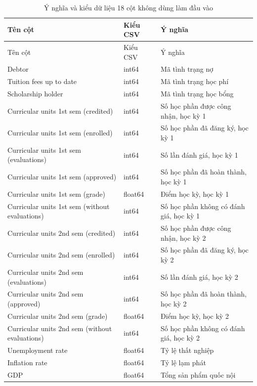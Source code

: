 \begin{longtable}{>{\raggedright\arraybackslash}p{6.3cm}p{1.5cm}>{\raggedright\arraybackslash}p{5.2cm}}
\caption{Ý nghĩa và kiểu dữ liệu 18 cột không dùng làm đầu vào}\\\toprule
Tên cột & Kiểu CSV & Ý nghĩa\\\midrule\endfirsthead
\toprule Tên cột & Kiểu CSV & Ý nghĩa\\\midrule\endhead
Debtor & int64 & Mã tình trạng nợ\\
Tuition fees up to date & int64 & Mã tình trạng học phí\\
Scholarship holder & int64 & Mã tình trạng học bổng\\
Curricular units 1st sem (credited) & int64 & Số học phần được công nhận, học kỳ 1\\
Curricular units 1st sem (enrolled) & int64 & Số học phần đã đăng ký, học kỳ 1\\
Curricular units 1st sem (evaluations) & int64 & Số lần đánh giá, học kỳ 1\\
Curricular units 1st sem (approved) & int64 & Số học phần đã hoàn thành, học kỳ 1\\
Curricular units 1st sem (grade) & float64 & Điểm học kỳ, học kỳ 1\\
Curricular units 1st sem (without evaluations) & int64 & Số học phần không có đánh giá, học kỳ 1\\
Curricular units 2nd sem (credited) & int64 & Số học phần được công nhận, học kỳ 2\\
Curricular units 2nd sem (enrolled) & int64 & Số học phần đã đăng ký, học kỳ 2\\
Curricular units 2nd sem (evaluations) & int64 & Số lần đánh giá, học kỳ 2\\
Curricular units 2nd sem (approved) & int64 & Số học phần đã hoàn thành, học kỳ 2\\
Curricular units 2nd sem (grade) & float64 & Điểm học kỳ, học kỳ 2\\
Curricular units 2nd sem (without evaluations) & int64 & Số học phần không có đánh giá, học kỳ 2\\
Unemployment rate & float64 & Tỷ lệ thất nghiệp\\
Inflation rate & float64 & Tỷ lệ lạm phát\\
GDP & float64 & Tổng sản phẩm quốc nội\\
\bottomrule\end{longtable}

